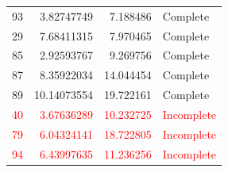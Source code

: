 \begin{longtable}{rrrl}
93 & 3.82747749 & 7.188486 & Complete \\
29 & 7.68411315 & 7.970465 & Complete \\
85 & 2.92593767 & 9.269756 & Complete \\
87 & 8.35922034 & 14.044454 & Complete \\
89 & 10.14073554 & 19.722161 & Complete \\
\textcolor{red}{40} & \textcolor{red}{3.67636289} & \textcolor{red}{10.232725} & \textcolor{red}{Incomplete} \\
\textcolor{red}{79} & \textcolor{red}{6.04324141} & \textcolor{red}{18.722805} & \textcolor{red}{Incomplete} \\
\textcolor{red}{94} & \textcolor{red}{6.43997635} & \textcolor{red}{11.236256} & \textcolor{red}{Incomplete} \\
\end{longtable}
\endgroup
